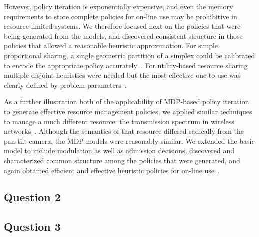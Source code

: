 However, policy iteration is exponentially expensive, and even the memory 
requirements to store complete policies for on-line use may be prohibitive 
in resource-limited systems.  We therefore focused next on the policies 
that were being generated from the models, and discovered consistent 
structure in those policies that allowed a reasonable heuristic 
approximation.  For simple proportional sharing, a single geometric partition
of a simplex could be calibrated to encode the appropriate policy accurately~\cite{gtspmgs10}.
For utility-based resource sharing multiple disjoint heuristics were needed but
the most effective one to use was clearly defined by problem parameters~\cite{tblwgs11}.

As a further illustration both of the applicability of MDP-based
policy iteration to generate effective resource management policies,
we applied similar techniques to manage a much different resource:
the transmission spectrum in wireless networks~\cite{mskgct13}.  Although 
the semantics of that resource differed radically from the pan-tilt camera, 
the MDP models were reasonably similar.  We extended the basic model to
include modulation as well as admission decisions, discovered and characterized
common structure among the policies that were generated, and again obtained
efficient and effective heuristic policies for on-line use~\cite{mgc16}.


\subsection{Question 2}


\subsection{Question 3}

